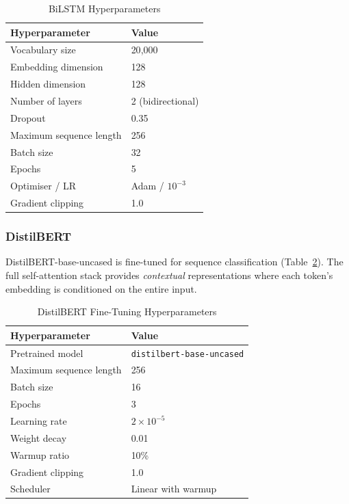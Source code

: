 \begin{table}[h]
\centering
\caption{BiLSTM Hyperparameters}
\label{tab:bilstm_hp}
\begin{tabular}{ll}
\toprule
Hyperparameter & Value \\
\midrule
Vocabulary size     & 20{,}000 \\
Embedding dimension & 128 \\
Hidden dimension    & 128 \\
Number of layers    & 2 (bidirectional) \\
Dropout             & 0.35 \\
Maximum sequence length & 256 \\
Batch size          & 32 \\
Epochs              & 5 \\
Optimiser / LR      & Adam / $10^{-3}$ \\
Gradient clipping   & 1.0 \\
\bottomrule
\end{tabular}
\end{table}

\subsubsection{DistilBERT}

DistilBERT-base-uncased \cite{sanh2019distilbert} is fine-tuned for sequence
classification (Table~\ref{tab:bert_hp}). The full self-attention stack
provides \emph{contextual} representations where each token's embedding is
conditioned on the entire input.

\begin{table}[h]
\centering
\caption{DistilBERT Fine-Tuning Hyperparameters}
\label{tab:bert_hp}
\begin{tabular}{ll}
\toprule
Hyperparameter & Value \\
\midrule
Pretrained model        & \texttt{distilbert-base-uncased} \\
Maximum sequence length & 256 \\
Batch size              & 16 \\
Epochs                  & 3 \\
Learning rate           & $2 \times 10^{-5}$ \\
Weight decay            & 0.01 \\
Warmup ratio            & 10\% \\
Gradient clipping       & 1.0 \\
Scheduler               & Linear with warmup \\
\bottomrule
\end{tabular}
\end{table}

